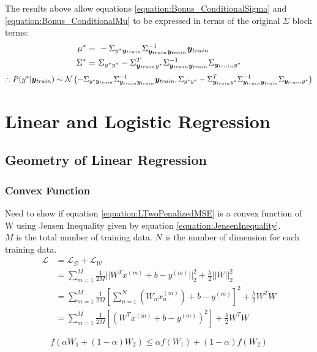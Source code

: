 \documentclass[a4paper,12pt]{article}
\begin{document}
The results above allow equations \ref{equation:Bonus_ConditionalSigma} and \ref{equation:Bonus_ConditionalMu} to be expressed in terms of the original $\Sigma$ block terms:
\begin{align}
	\mu^* =& \ - \Sigma_{y^* \bm{y}_{train}} \Sigma_{\bm{y}_{train} \bm{y}_{train}}^{-1} \bm{y}_{train} \\
	\Sigma^* =& \ \Sigma_{y^* y^*} - \Sigma_{\bm{y}_{train} y^*}^{T} \Sigma_{\bm{y}_{train} \bm{y}_{train}}^{-1} \Sigma_{\bm{y}_{train} y^*}
\end{align}
\begin{align}
	\therefore P(y^* | \bm{y}_{train}) \sim \mathcal{N} 
    \left( - \Sigma_{y^* \bm{y}_{train}} \Sigma_{\bm{y}_{train} \bm{y}_{train}}^{-1} \bm{y}_{train}, \Sigma_{y^* y^*} - \Sigma_{\bm{y}_{train} y^*}^{T} \Sigma_{\bm{y}_{train} \bm{y}_{train}}^{-1} \Sigma_{\bm{y}_{train} y^*} \right)
\end{align}
\clearpage
\section{Linear and Logistic Regression}
\subsection{Geometry of Linear Regression}
\subsubsection{Convex Function}
Need to show if equation \ref{equation:LTwoPenalizedMSE} is a convex function of W using Jensen Inequality given by equation 
\ref{equation:JensenInequality}. \\

$M$ is the total number of training data. 
$N$ is the number of dimension for each training data. 
\begin{equation}
\label{equation:LTwoPenalizedMSE}
\begin{split}
\mathcal{L} &= \mathcal{L_D} + \mathcal{L_W} \\
	&= \sum_{m=1}^{M} \frac{1}{2M} ||W^{T}x^{(m)} + b - y^{(m)}||_{2}^{2} + \frac{\lambda}{2} ||W||_{2}^{2} \\
	&= \sum_{m=1}^{M} \frac{1}{2M} \left[\sum_{n=1}^{N}(W_{n}x^{(m)}_{n}) + b - y^{(m)}\right]^{2} + \frac{\lambda}{2} W^{T}W \\
    &= \sum_{m=1}^{M} \frac{1}{2M} \left[(W^{T}x^{(m)} + b - y^{(m)})^{2}\right] + \frac{\lambda}{2} W^{T}W 
\end{split}
\end{equation}

\begin{equation}
\label{equation:JensenInequality}
f(\alpha W_{1} + (1-\alpha)W_{2}) \leq \alpha f(W_{1}) + (1-\alpha)f(W_{2})
\end{equation}
\end{document}
